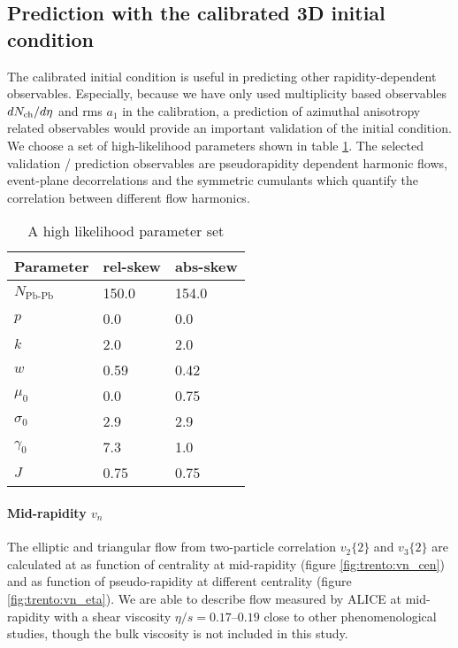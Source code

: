 \subsection{Prediction with the calibrated 3D initial condition}
The calibrated initial condition is useful in predicting other rapidity-dependent observables.
Especially, because we have only used multiplicity based observables $dN_\text{ch}/d\eta$ and rms $a_1$ in the calibration, a prediction of azimuthal anisotropy related observables would provide an important validation of the initial condition.
We choose a set of high-likelihood parameters shown in table \ref{tab:chosen_parameters}.
The selected validation / prediction observables are pseudorapidity dependent harmonic flows, event-plane decorrelations and the symmetric cumulants which quantify the correlation between different flow harmonics.

\begin{table}
\centering
\caption{A high likelihood parameter set}
\begin{tabular}{lll}
\hline
Parameter & rel-skew	& abs-skew \\
\hline
$N_{\textrm{Pb-Pb}}$   & 150.0     & 154.0  \\
$p$	    & 0.0      & 0.0  \\
$k$	    & 2.0     & 2.0  \\
$w$	    & 0.59     & 0.42  \\
$\mu_0$   & 0.0     & 0.75  \\
$\sigma_0$ & 2.9    & 2.9  \\
$\gamma_0$ & 7.3		& 1.0	\\
$J$	     & 0.75 & 0.75	\\
\hline
\end{tabular}
\label{tab:chosen_parameters}    
\end{table}

\paragraph{Mid-rapidity $v_n$} The elliptic and triangular flow from two-particle correlation $v_2\{2\}$ and $v_3\{2\}$ are calculated at as function of centrality at mid-rapidity (figure \ref{fig:trento:vn_cen}) and as function of pseudo-rapidity at different centrality (figure \ref{fig:trento:vn_eta}).
We are able to describe flow measured by ALICE \cite{Adam:2016izf} at mid-rapidity with a shear viscosity $\eta/s = 0.17$--$0.19$ close to other phenomenological studies, though the bulk viscosity is not included in this study.


